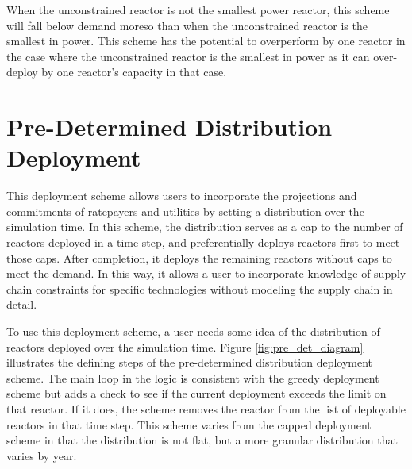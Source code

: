 When the unconstrained reactor is not the smallest power reactor, this scheme
will fall below demand moreso than when the unconstrained reactor is the
smallest in power. This scheme has the potential to overperform by one reactor
in the case where the unconstrained reactor is the smallest in power as it can
over-deploy by one reactor's capacity in that case.

\section{Pre-Determined Distribution Deployment}
\label{sec:pre_determined_distribution_deployment}
This deployment scheme allows users to incorporate the projections and
commitments of ratepayers and utilities by setting a distribution over the
simulation time. In this scheme, the distribution serves as a cap to the
number of reactors deployed in a time step, and preferentially
deploys reactors first to meet those caps. After completion, it deploys the
remaining reactors without caps to meet the demand. In this way, it allows a user to incorporate knowledge of supply chain constraints for specific technologies without modeling the supply chain in detail.

To use this deployment scheme, a user needs some idea of the distribution of reactors deployed over the simulation time. Figure \ref{fig:pre_det_diagram} illustrates the defining steps of the pre-determined distribution deployment scheme. The main loop in the logic is consistent with the greedy deployment scheme but adds a check to see if the current deployment exceeds the limit on that reactor. If it does, the scheme removes the reactor from the list of deployable reactors in that time step. This scheme varies from the capped deployment scheme in that the distribution is not flat, but a more granular distribution that varies by year.

